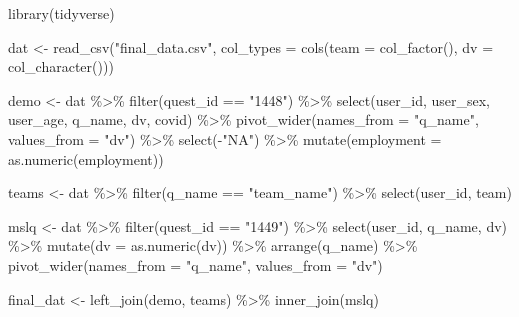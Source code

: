 \documentclass[
  oneside]{book}
\newenvironment{Shaded}{\begin{snugshade}}{\end{snugshade}}
\newcommand{\AttributeTok}[1]{\textcolor[rgb]{0.77,0.63,0.00}{#1}}
\newcommand{\FunctionTok}[1]{\textcolor[rgb]{0.00,0.00,0.00}{#1}}
\newcommand{\NormalTok}[1]{#1}
\newcommand{\OtherTok}[1]{\textcolor[rgb]{0.56,0.35,0.01}{#1}}
\newcommand{\SpecialCharTok}[1]{\textcolor[rgb]{0.00,0.00,0.00}{#1}}
\newcommand{\StringTok}[1]{\textcolor[rgb]{0.31,0.60,0.02}{#1}}
\begin{document}
\begin{Shaded}
\begin{Highlighting}[]
\FunctionTok{library}\NormalTok{(tidyverse)}

\NormalTok{dat }\OtherTok{\textless{}{-}} \FunctionTok{read\_csv}\NormalTok{(}\StringTok{"final\_data.csv"}\NormalTok{, }
                \AttributeTok{col\_types =} \FunctionTok{cols}\NormalTok{(}\AttributeTok{team =} \FunctionTok{col\_factor}\NormalTok{(), }
                                 \AttributeTok{dv =} \FunctionTok{col\_character}\NormalTok{()))}

\NormalTok{demo }\OtherTok{\textless{}{-}}\NormalTok{  dat }\SpecialCharTok{\%\textgreater{}\%}
  \FunctionTok{filter}\NormalTok{(quest\_id }\SpecialCharTok{==} \StringTok{"1448"}\NormalTok{) }\SpecialCharTok{\%\textgreater{}\%}
  \FunctionTok{select}\NormalTok{(user\_id, user\_sex, user\_age, q\_name, dv, covid) }\SpecialCharTok{\%\textgreater{}\%}
  \FunctionTok{pivot\_wider}\NormalTok{(}\AttributeTok{names\_from =} \StringTok{"q\_name"}\NormalTok{, }\AttributeTok{values\_from =} \StringTok{"dv"}\NormalTok{) }\SpecialCharTok{\%\textgreater{}\%}
  \FunctionTok{select}\NormalTok{(}\SpecialCharTok{{-}}\StringTok{"NA"}\NormalTok{) }\SpecialCharTok{\%\textgreater{}\%}
  \FunctionTok{mutate}\NormalTok{(}\AttributeTok{employment =} \FunctionTok{as.numeric}\NormalTok{(employment))}

\NormalTok{teams }\OtherTok{\textless{}{-}}\NormalTok{  dat }\SpecialCharTok{\%\textgreater{}\%}
  \FunctionTok{filter}\NormalTok{(q\_name }\SpecialCharTok{==} \StringTok{"team\_name"}\NormalTok{) }\SpecialCharTok{\%\textgreater{}\%}
  \FunctionTok{select}\NormalTok{(user\_id, team)}

\NormalTok{mslq }\OtherTok{\textless{}{-}}\NormalTok{  dat }\SpecialCharTok{\%\textgreater{}\%}
  \FunctionTok{filter}\NormalTok{(quest\_id }\SpecialCharTok{==} \StringTok{"1449"}\NormalTok{) }\SpecialCharTok{\%\textgreater{}\%}
  \FunctionTok{select}\NormalTok{(user\_id, q\_name, dv) }\SpecialCharTok{\%\textgreater{}\%}
  \FunctionTok{mutate}\NormalTok{(}\AttributeTok{dv =} \FunctionTok{as.numeric}\NormalTok{(dv)) }\SpecialCharTok{\%\textgreater{}\%}
  \FunctionTok{arrange}\NormalTok{(q\_name) }\SpecialCharTok{\%\textgreater{}\%}
  \FunctionTok{pivot\_wider}\NormalTok{(}\AttributeTok{names\_from =} \StringTok{"q\_name"}\NormalTok{, }\AttributeTok{values\_from =} \StringTok{"dv"}\NormalTok{)}

\NormalTok{final\_dat }\OtherTok{\textless{}{-}} \FunctionTok{left\_join}\NormalTok{(demo, teams) }\SpecialCharTok{\%\textgreater{}\%}
  \FunctionTok{inner\_join}\NormalTok{(mslq)}
\end{Highlighting}
\end{Shaded}
\end{document}
